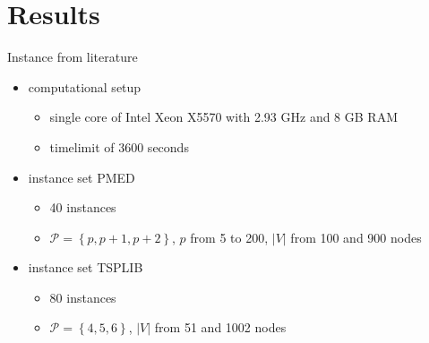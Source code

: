 \documentclass[utf8,aspectratio=169,ngerman,english]{beamer}
\renewcommand{\emph}[1]{\textcolor{jkuGreen}{#1}}
\begin{document}
\section{Results}
\begin{frame}{Instance from literature}
    \vspace*{-2pt}
    \begin{itemize}
        \item computational setup
        \begin{itemize}
            \item single core of Intel Xeon X5570 with 2.93 GHz and 8 GB RAM
            \item \emph{timelimit} of 3600 seconds
        \end{itemize}\pause
        \item instance set \emph{PMED} \cite{chen2009new,contardo2019scalable,calik2013double}
              \begin{itemize}
                \item 40 instances
                \item $\mathcal P = \left \{p, p+1, p+2\right \}$, $p$ from 5 to 200, $\left|V\right|$ from 100 and 900 nodes                  
              \end{itemize} \pause
        \item instance set \emph{TSPLIB} \cite{contardo2019scalable, GAAR2022}
              \begin{itemize}
                  \item 80 instances
                  \item $\mathcal P = \left \{4, 5, 6\right \}$, $\left|V\right|$ from 51 and 1002 nodes
              \end{itemize}
    \end{itemize}
\end{frame}

\end{document}
